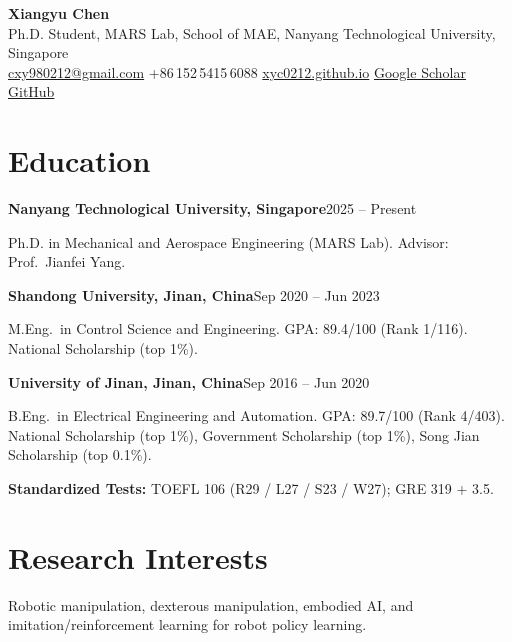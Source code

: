 \documentclass[11pt,a4paper]{article}
\newcommand{\dateit}[2]{\textbf{#1}\hfill #2\par}
\begin{document}
\pagestyle{empty}

\begin{center}
  {\Huge\bfseries Xiangyu Chen}\\[5pt]
  {\small Ph.D. Student, MARS Lab, School of MAE, Nanyang Technological University, Singapore}\\[4pt]
  {\small
    \href{mailto:cxy980212@gmail.com}{cxy980212@gmail.com}
    \quad\textbar\quad +86\,152\,5415\,6088
    \quad\textbar\quad \href{https://xyc0212.github.io}{xyc0212.github.io}
    \quad\textbar\quad \href{https://scholar.google.com/citations?user=wEV8pmkAAAAJ}{Google Scholar}
    \quad\textbar\quad \href{https://github.com/XyC0212}{GitHub}
  }
\end{center}

\section{Education}
\dateit{Nanyang Technological University, Singapore}{2025 -- Present}
Ph.D. in Mechanical and Aerospace Engineering (MARS Lab). Advisor: Prof.\ Jianfei Yang.

\smallskip
\dateit{Shandong University, Jinan, China}{Sep 2020 -- Jun 2023}
M.Eng.\ in Control Science and Engineering. GPA: 89.4/100 (Rank 1/116). National Scholarship (top 1\%).

\smallskip
\dateit{University of Jinan, Jinan, China}{Sep 2016 -- Jun 2020}
B.Eng.\ in Electrical Engineering and Automation. GPA: 89.7/100 (Rank 4/403). National Scholarship (top 1\%), Government Scholarship (top 1\%), Song Jian Scholarship (top 0.1\%).

\smallskip
\textbf{Standardized Tests:} TOEFL 106 (R29 / L27 / S23 / W27); GRE 319 + 3.5.

\section{Research Interests}
Robotic manipulation, dexterous manipulation, embodied AI, and imitation/reinforcement learning for robot policy learning.

\end{document}
